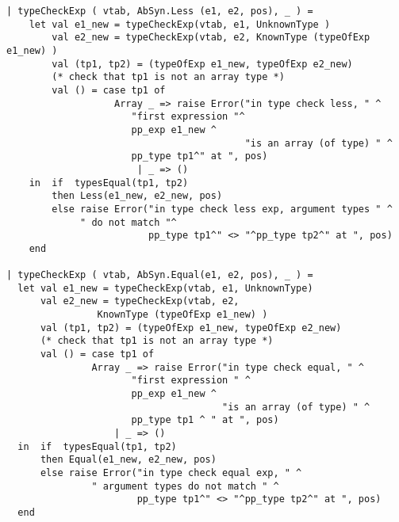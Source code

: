 \documentclass[12pt,a4paper,english]{article}
\begin{document}
\begin{lstlisting}[caption=Changes in type.sml for task 3. (continued from listing10)]
| typeCheckExp ( vtab, AbSyn.Less (e1, e2, pos), _ ) =
    let val e1_new = typeCheckExp(vtab, e1, UnknownType )
        val e2_new = typeCheckExp(vtab, e2, KnownType (typeOfExp e1_new) )
        val (tp1, tp2) = (typeOfExp e1_new, typeOfExp e2_new)
        (* check that tp1 is not an array type *)
        val () = case tp1 of
                   Array _ => raise Error("in type check less, " ^
					  "first expression "^ 
					  pp_exp e1_new ^
                                          "is an array (of type) " ^
					  pp_type tp1^" at ", pos)
                       | _ => ()
    in  if  typesEqual(tp1, tp2)
        then Less(e1_new, e2_new, pos)
        else raise Error("in type check less exp, argument types " ^
			 " do not match "^
                         pp_type tp1^" <> "^pp_type tp2^" at ", pos)
    end

| typeCheckExp ( vtab, AbSyn.Equal(e1, e2, pos), _ ) =
  let val e1_new = typeCheckExp(vtab, e1, UnknownType)
      val e2_new = typeCheckExp(vtab, e2, 
		   		KnownType (typeOfExp e1_new) )
      val (tp1, tp2) = (typeOfExp e1_new, typeOfExp e2_new)
      (* check that tp1 is not an array type *)
      val () = case tp1 of
               Array _ => raise Error("in type check equal, " ^
				      "first expression " ^
				      pp_exp e1_new ^
                                      "is an array (of type) " ^
				      pp_type tp1 ^ " at ", pos)
                   | _ => ()
  in  if  typesEqual(tp1, tp2)
      then Equal(e1_new, e2_new, pos)
      else raise Error("in type check equal exp, " ^
		       " argument types do not match " ^
                       pp_type tp1^" <> "^pp_type tp2^" at ", pos)
  end

\end{lstlisting}
\end{document}
